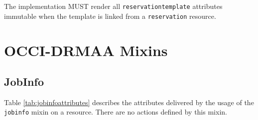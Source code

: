 \documentclass[10pt]{article}
\newcommand{\h}[1]{\lstinline|#1|}
\newcommand{\rat}[1]{}
\begin{document}
The implementation MUST render all \h{reservationtemplate} attributes immutable when the template is linked from a \h{reservation} resource.

\rat{This is the case when the reservation template resource represents the properties of a valid reservation. The other case is the creation of a reservation template resource by the client for reservation creation purposes.}


\section{OCCI-DRMAA Mixins}




\subsection{JobInfo}

Table \ref{tab:jobinfoattributes} describes the attributes delivered by the usage of the \h{jobinfo} mixin on a resource. There are no actions defined by this mixin.
\end{document}
